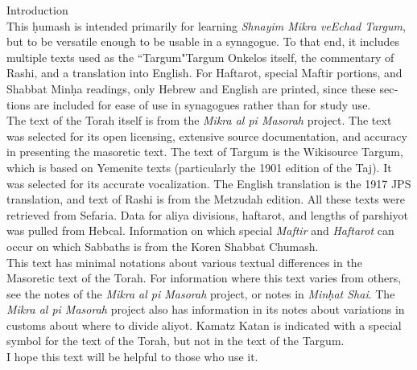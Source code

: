 \tableofcontents
\clearpage
{}	
\begin{minipage}{\textwidth}\englishfont
	
\begin{english}
\vspace{16pt}
\Large Introduction\vspace{12pt}\\
\normalsize
This \d{h}umash is intended primarily for learning \textit{Shnayim Mikra veEchad Targum}, but to be versatile enough to be usable in a synagogue. To that end, it includes multiple texts used as the ``Targum"\textemdash Targum Onkelos itself, the commentary of Rashi, and a translation into English.  For Haftarot, special Maftir portions, and Shabbat Min\d{h}a readings, only Hebrew and English are printed, since these sections are included for ease of use in synagogues rather than for study use.\\

The text of the Torah itself is from the \textit{Mikra al pi Masorah} project. The text was selected for its open licensing, extensive source documentation, and accuracy in presenting the masoretic text.  The text of Targum is the Wikisource Targum, which is based on Yemenite texts (particularly the 1901 edition of the Taj). It was selected for its accurate vocalization.
The English translation is the 1917 JPS translation, and text of Rashi is from the Metzudah edition.  All these texts were retrieved from Sefaria. Data for aliya divisions, haftarot, and lengths of parshiyot was pulled from Hebcal. Information on which special \textit{Maftir} and \textit{Haftarot} can occur on which Sabbaths is from the Koren Shabbat Chumash.\\

This text has minimal notations about various textual differences in the Masoretic text of the Torah. For information where this text varies from others, see the notes of the \textit{Mikra al pi Masorah} project, or notes in \textit{Min\d{h}at Shai}. The \textit{Mikra al pi Masorah} project also has information in its notes about variations in customs about where to divide aliyot. Kamatz Katan is indicated with a special symbol for the text of the Torah, but not in the text of the Targum.\\

I hope this text will be helpful to those who use it.

\end{english}

\end{minipage}


